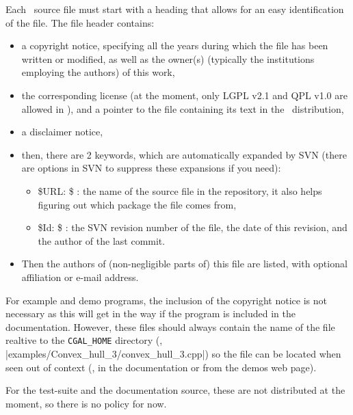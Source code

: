 Each \cgal\ source file must start with a heading that allows for an easy
identification of the file.  The file header contains:
\begin{itemize}
\item a copyright notice, specifying all the years during which the file has
been written or modified, as well as the owner(s) (typically the institutions
employing the authors) of this work,
\item the corresponding license (at the moment, only LGPL v2.1 and QPL v1.0
are allowed in \cgal), and a pointer to the file containing its text in the
\cgal\ distribution,
\item a disclaimer notice,
\item then, there are 2 keywords, which are automatically expanded by SVN
(there are options in SVN to suppress these expansions if you need):
\begin{itemize}
\item \${}URL: \$ : the name of the source file in the repository, it also
helps figuring out which package the file comes from,
\item \${}Id: \$ : the SVN revision number of the file, the date of this revision,
and the author of the last commit.
\end{itemize}
\item Then the authors of (non-negligible parts of) this file are listed, with
optional affiliation or e-mail address.
\end{itemize}

For example and demo programs, the inclusion of the copyright notice is not
necessary as this will get in the way if the program is included in the
documentation.  However, these files should always contain the name of
the file realtive to the \texttt{CGAL\_HOME} directory
(\eg, \nonlinkedpath|examples/Convex_hull_3/convex_hull_3.cpp|)
so the file can be located when seen out of context (\eg, in the documentation
or from the demos web page).

For the test-suite and the documentation source, these are not distributed at
the moment, so there is no policy for now.

\InternalOnly{

}

